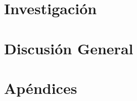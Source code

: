 \documentclass[%
    paper=A4,               %
    twoside=true,           %
    openright,              %
    parskip=half,           %
    chapterprefix=true,     %
    12pt,                   %
    headings=normal,        %
    bibliography=totoc,     %
    listof=totoc,           %
    titlepage=on,           %
    captions=tableabove,    %
    chapterprefix=false,    %
    appendixprefix=false,    %
    draft=false,            %
]{scrreprt}%
\begin{document}
\part{Investigación}
   
  
 
 
   
 

\part{Discusión General}
       

%
{%
\renewcommand{\bibfont}{\scriptsize}
\setlength{\biblabelsep}{0pt}
\setlength{\bibhang}{.25\bibhang}
\setlength{\bibitemsep}{0.1\baselineskip plus 0.1\baselineskip}
\printbibliography
}%
\cleardoublepage




\part{Apéndices}
\appendix\cleardoublepage

\cleardoublepage



\newpage
\mbox{}

\end{document}
